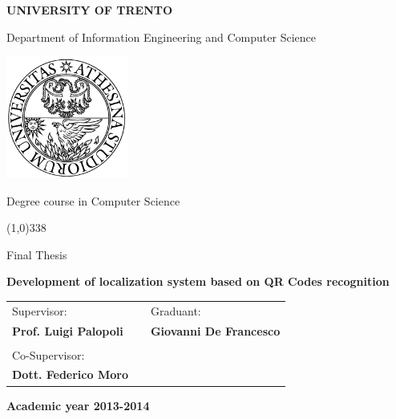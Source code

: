 \begin{titlepage}
  \pagestyle{empty}

  \begin{center}
    {\bfseries\Large {\huge U}NIVERSITY OF {\huge T}RENTO}

    \vspace{0.2cm}

    {\large Department of Information Engineering and Computer Science}

    \vspace{0.5cm}

    \begin{center}
      \includegraphics[width=0.3\textwidth]{img/logo_unitn.png}
    \end{center}

    \vspace{0.5cm}

    {\Large Degree course in Computer Science}

    \vspace{0.2cm}
    \line(1,0){338}
    \vspace{0.5cm}

    {\Large Final Thesis}

    \vspace{2.0cm}

    {\Large \bfseries {Development of localization system based on QR Codes recognition}}

    \vspace{0.3cm}
    

    \large
    \begin{center}
      \begin{tabular}{lcl}
        Supervisor: & \hspace{4cm} &  \hspace{1.5cm} Graduant: \\
        {\bfseries Prof. Luigi Palopoli} & \hspace{2cm} & {\bfseries Giovanni De Francesco } \\ \\
        Co-Supervisor: \\ {\bfseries Dott. Federico Moro}
      \end{tabular}
    \end{center}
    \vspace{2.0cm}

    {\large \bfseries Academic year 2013-2014}
    \vfill

  \end{center}

\end{titlepage}
